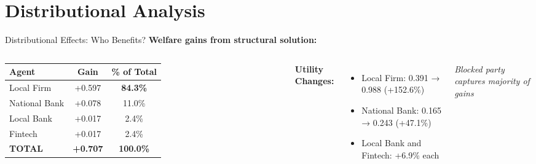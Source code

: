 \documentclass[aspectratio=169]{beamer}
\begin{document}
\section{Distributional Analysis}

\begin{frame}{Distributional Effects: Who Benefits?}
    \textbf{Welfare gains from structural solution:}
    
    \vspace{0.3cm}
    \begin{columns}
        \begin{table}
            \centering
            \small
            \begin{tabular}{lcc}
                \toprule
                \textbf{Agent} & \textbf{Gain} & \textbf{\% of Total} \\
                \midrule
                Local Firm & +0.597 & \textcolor{SafeGreen}{\textbf{84.3\%}} \\
                National Bank & +0.078 & 11.0\% \\
                Local Bank & +0.017 & 2.4\% \\
                Fintech & +0.017 & 2.4\% \\
                \midrule
                \textbf{TOTAL} & \textbf{+0.707} & \textbf{100.0\%} \\
                \bottomrule
            \end{tabular}
        \end{table}
        
        \vspace{0.3cm}
        \textbf{Utility Changes:}
        \begin{itemize}
            \item Local Firm: 0.391 → 0.988 \textcolor{SafeGreen}{(+152.6\%)}
            \item National Bank: 0.165 → 0.243 (+47.1\%)
            \item Local Bank and Fintech: +6.9\% each
        \end{itemize}
        
        \centering
        
        \vspace{0.3cm}
        \small{\textit{Blocked party captures majority of gains}}
    \end{columns}
\end{frame}
\end{document}

